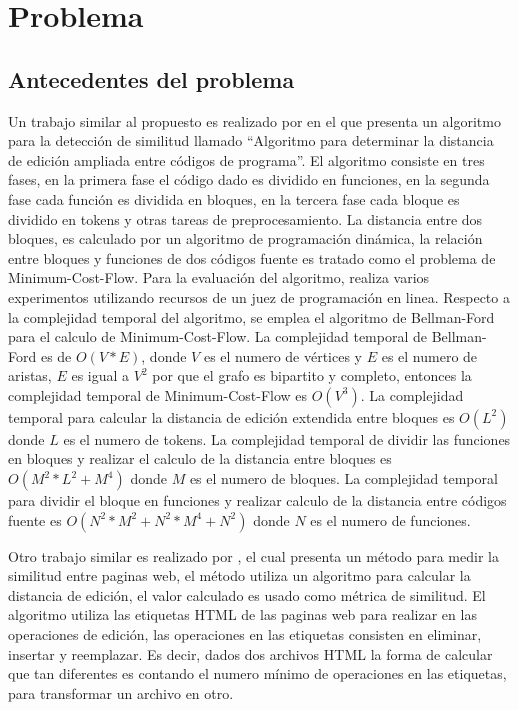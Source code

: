 \section{Problema}
\subsection{Antecedentes del problema}
Un trabajo similar al propuesto es realizado por \cite{Anzai2019} en el que presenta un algoritmo para la detección de similitud llamado ``Algoritmo para determinar la distancia de edición ampliada entre códigos de programa''. El algoritmo consiste en tres fases, en la primera fase el código dado es dividido en funciones, en la segunda fase cada función es dividida en bloques, en la tercera fase cada bloque es dividido en tokens y otras tareas de preprocesamiento. La distancia entre dos bloques, es calculado por un algoritmo de programación dinámica, la relación entre bloques y funciones de dos códigos fuente es tratado como el problema de Minimum-Cost-Flow. Para la evaluación del algoritmo, realiza varios experimentos utilizando recursos de un juez de programación en linea. Respecto a la complejidad temporal del algoritmo, se emplea el algoritmo de Bellman-Ford para el calculo de Minimum-Cost-Flow. La complejidad temporal de Bellman-Ford es de $O(V*E)$, donde $V$ es el numero de vértices y $E$ es el numero de aristas, $E$ es igual a $V^{2}$ por que el grafo es bipartito y completo, entonces la complejidad temporal de Minimum-Cost-Flow es $O(V^{3})$. La complejidad temporal para calcular la distancia de edición extendida entre bloques es $O(L^{2})$ donde $L$ es el numero de tokens. La complejidad temporal de dividir las funciones en bloques y realizar el calculo de la distancia entre bloques es $O(M^{2}*L^{2}+M^{4})$ donde $M$ es el numero de bloques. La complejidad temporal para dividir el bloque en funciones y realizar calculo de la distancia entre códigos fuente es $O(N^{2}*M^{2}+N^{2}*M^{4}+N^{2})$ donde $N$ es el numero de funciones.

Otro trabajo similar es realizado por \cite{Popescu2016}, el cual presenta un método para medir la similitud entre paginas web, el método utiliza un algoritmo para calcular la distancia de edición, el valor calculado es usado como métrica de similitud. El algoritmo utiliza las etiquetas HTML de las paginas web para realizar en las operaciones de edición, las operaciones en las etiquetas consisten en eliminar, insertar y reemplazar. Es decir, dados dos archivos HTML la forma de calcular que tan diferentes es contando el numero mínimo de operaciones en las etiquetas, para transformar un archivo en otro.

